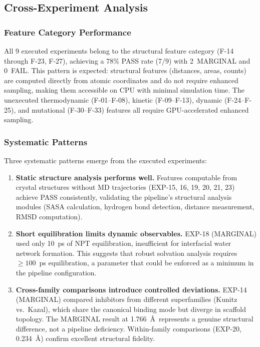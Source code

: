 \documentclass[conference]{IEEEtran}
\begin{document}
\subsection{Cross-Experiment Analysis}\label{sec:v3_cross}

\subsubsection{Feature Category Performance}

All 9 executed experiments belong to the structural feature category
(F-14 through F-23, F-27), achieving a 78\% PASS rate (7/9) with
2~MARGINAL and 0~FAIL.  This pattern is expected: structural features
(distances, areas, counts) are computed directly from atomic coordinates
and do not require enhanced sampling, making them accessible on CPU with
minimal simulation time.  The unexecuted thermodynamic (F-01--F-08),
kinetic (F-09--F-13), dynamic (F-24--F-25), and mutational (F-30--F-33)
features all require GPU-accelerated enhanced sampling.

\subsubsection{Systematic Patterns}

Three systematic patterns emerge from the executed experiments:

\begin{enumerate}
  \item \textbf{Static structure analysis performs well.}  Features
    computable from crystal structures without MD trajectories (EXP-15,
    16, 19, 20, 21, 23) achieve PASS consistently, validating the
    pipeline's structural analysis modules (SASA calculation, hydrogen
    bond detection, distance measurement, RMSD computation).

  \item \textbf{Short equilibration limits dynamic observables.}  EXP-18
    (MARGINAL) used only 10~ps of NPT equilibration, insufficient for
    interfacial water network formation.  This suggests that robust
    solvation analysis requires $\geq 100$~ps equilibration, a parameter
    that could be enforced as a minimum in the pipeline configuration.

  \item \textbf{Cross-family comparisons introduce controlled deviations.}
    EXP-14 (MARGINAL) compared inhibitors from different superfamilies
    (Kunitz vs.\ Kazal), which share the canonical binding mode but
    diverge in scaffold topology.  The MARGINAL result at 1.766~\AA\
    represents a genuine structural difference, not a pipeline deficiency.
    Within-family comparisons (EXP-20, 0.234~\AA) confirm excellent
    structural fidelity.
\end{enumerate}
\end{document}
